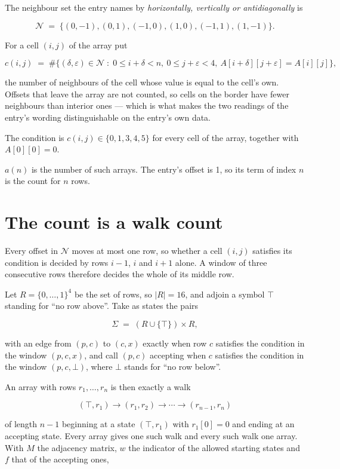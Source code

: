\documentclass[11pt]{article}
\theoremstyle{definition}
\begin{document}
The neighbour set the entry names by {\itshape horizontally, vertically or antidiagonally} is

\[\mathcal{N} \;=\; \{(0,-1), (0,1), (-1,0), (1,0), (-1,1), (1,-1)\}.\]

For a cell $(i,j)$ of the array put

\[c(i,j) \;=\; \#\bigl\{(\delta,\varepsilon)\in\mathcal{N} \;:\; 0\le i+\delta<n,\ 0\le j+\varepsilon<4,\ A[i+\delta][j+\varepsilon] = A[i][j]\bigr\},\]

the number of neighbours of the cell whose value is equal to the cell's own. Offsets that leave the array are not counted, so cells on the border have fewer neighbours than interior ones --- which is what makes the two readings of the entry's wording distinguishable on the entry's own data.

The condition is $c(i,j) \in \{0, 1, 3, 4, 5\}$ for every cell of the array, together with $A[0][0]=0$.

$a(n)$ is the number of such arrays. The entry's offset is 1, so its term of index $n$ is the count for $n$ rows.

\section{The count is a walk count}

Every offset in $\mathcal{N}$ moves at most one row, so whether a cell $(i,j)$ satisfies its condition is decided by rows $i-1$, $i$ and $i+1$ alone. A window of three consecutive rows therefore decides the whole of its middle row.

Let $R = \{0,\dots,1\}^{4}$ be the set of rows, so $|R| = 16$, and adjoin a symbol $\top$ standing for ``no row above''. Take as states the pairs

\[\Sigma \;=\; (R \cup \{\top\}) \times R,\]

with an edge from $(p,c)$ to $(c,x)$ exactly when row $c$ satisfies the condition in the window $(p,c,x)$, and call $(p,c)$ accepting when $c$ satisfies the condition in the window $(p,c,\bot)$, where $\bot$ stands for ``no row below''.

An array with rows $r_1,\dots,r_n$ is then exactly a walk

\[(\top,r_1) \to (r_1,r_2) \to \cdots \to (r_{n-1},r_n)\]

of length $n-1$ beginning at a state $(\top,r_1)$ with $r_1[0]=0$ and ending at an accepting state. Every array gives one such walk and every such walk one array. With $M$ the adjacency matrix, $w$ the indicator of the allowed starting states and $f$ that of the accepting ones,
\end{document}
